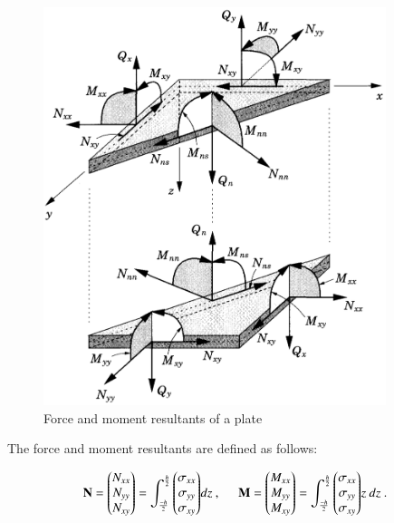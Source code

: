 \begin{figure}[H]
	\centering
	\includegraphics[width=10cm]{images/composite_force_resultants}
	\caption{Force and moment resultants of a plate \cite{reddy2004mechanics}}
	\label{fig:compositeforceresultants}
\end{figure}

The force and moment resultants are defined as follows:

\begin{equation} 
\mathbf{N} = 
\begin{pmatrix}
N_{xx} \\
N_{yy} \\
N_{xy} 
\end{pmatrix}
=
{\int_{\frac{-h}{2}}^{\frac{h}{2}}
\begin{pmatrix}
\sigma_{xx} \\
\sigma_{yy} \\
\sigma_{xy} 
\end{pmatrix}}
dz\ ,
\hspace{5mm}
\mathbf{M} = 
\begin{pmatrix}
M_{xx} \\
M_{yy} \\
M_{xy} 
\end{pmatrix}
=
{\int_{\frac{-h}{2}}^{\frac{h}{2}}
	\begin{pmatrix}
	\sigma_{xx} \\
	\sigma_{yy} \\
	\sigma_{xy} 
	\end{pmatrix}}z\ 
dz
\label{eqscomp_force_resultants}\ .
\end{equation}

